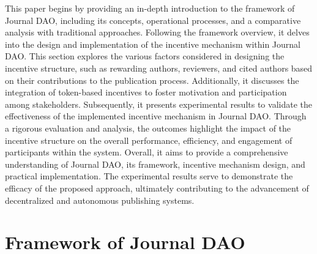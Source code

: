 \documentclass[lettersize,journal]{IEEEtran}
\begin{document}
This paper begins by providing an in-depth introduction to the framework of Journal DAO, including its concepts, operational processes, and a comparative analysis with traditional approaches. 
Following the framework overview, it delves into the design and implementation of the incentive mechanism within Journal DAO. This section explores the various factors considered in designing the incentive structure, such as rewarding authors, reviewers, and cited authors based on their contributions to the publication process. Additionally, it discusses the integration of token-based incentives to foster motivation and participation among stakeholders.
Subsequently, it presents experimental results to validate the effectiveness of the implemented incentive mechanism in Journal DAO. Through a rigorous evaluation and analysis, the outcomes highlight the impact of the incentive structure on the overall performance, efficiency, and engagement of participants within the system.
Overall, it aims to provide a comprehensive understanding of Journal DAO, its framework, incentive mechanism design, and practical implementation. The experimental results serve to demonstrate the efficacy of the proposed approach, ultimately contributing to the advancement of decentralized and autonomous publishing systems.



\section{Framework of Journal DAO}
\end{document}
